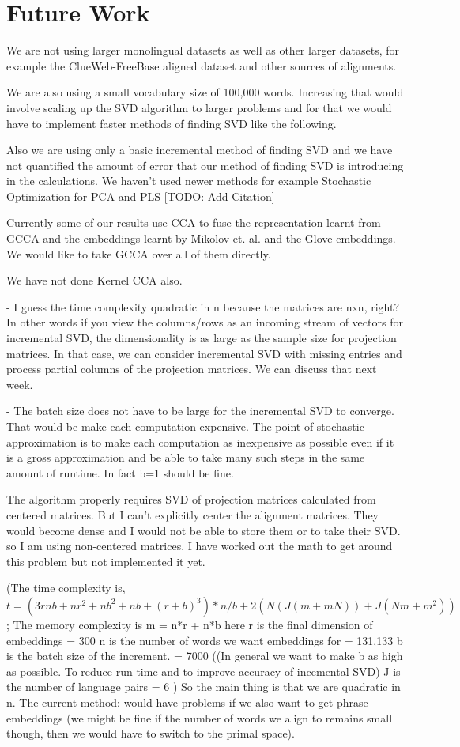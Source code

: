 \documentclass[11pt]{article}
\begin{document}
\section{Future Work}
We are not using larger monolingual datasets as well as other larger
datasets, for example the ClueWeb-FreeBase aligned dataset and other
sources of alignments.

We are also using a small vocabulary size of 100,000 words. Increasing
that would involve scaling up the SVD algorithm to 
larger problems and for that we would have to implement faster methods
of finding SVD like the following.

Also we are using only a basic incremental method of finding SVD and we have not quantified the amount of error that our
method of finding SVD is introducing in the calculations. 
We haven't used newer methods for example Stochastic Optimization for
PCA and PLS [TODO: Add Citation]

Currently some of our results use CCA to fuse the representation
learnt from GCCA and the embeddings learnt by Mikolov et. al. and the
Glove embeddings. We would like to take GCCA over all of them directly.

We have not done Kernel CCA also.

- I guess the time complexity quadratic in n because the matrices are
nxn, right? In other words if you view the columns/rows as an incoming
stream of vectors for incremental SVD, the dimensionality is as large
as the sample size for projection matrices. In that case, we can
consider incremental SVD with missing entries and process partial
columns of the projection matrices. We can discuss that next week.  

- The batch size does not have to be large for the incremental SVD to
converge. That would be make each computation expensive. The point of
stochastic approximation is to make each computation as inexpensive as
possible even if it is a gross approximation and be able to take many
such steps in the same amount of runtime. In fact b=1 should be fine.

The algorithm properly requires SVD of projection matrices
calculated from centered matrices. But I can't explicitly center the
alignment matrices. They would become dense and I would not be able to
store them or to take their SVD. so I am using non-centered
matrices. I have worked out the math to get around this problem but
not implemented it yet.

(The time complexity is,  $t =  (3rnb + nr^2 + nb^2 + nb + (r+b)^3)*n/b + 2 (N(J(m + mN)) + J(Nm + m^2))$;
  The memory complexity is m =  n*r + n*b 
  here r is the final dimension of embeddings = 300
n is the number of words we want embeddings for = 131,133
b is the batch size of the increment. = 7000 ((In general we want to make b as high as possible. To reduce run time and to improve accuracy of incemental SVD)
J is the number of language pairs = 6 )
So the main thing is that we are quadratic in n.  The current method:
would have problems if we also want to get phrase embeddings (we might
be fine if the number of words we align to remains small though, then
we would have to switch to the primal space).
\end{document}
